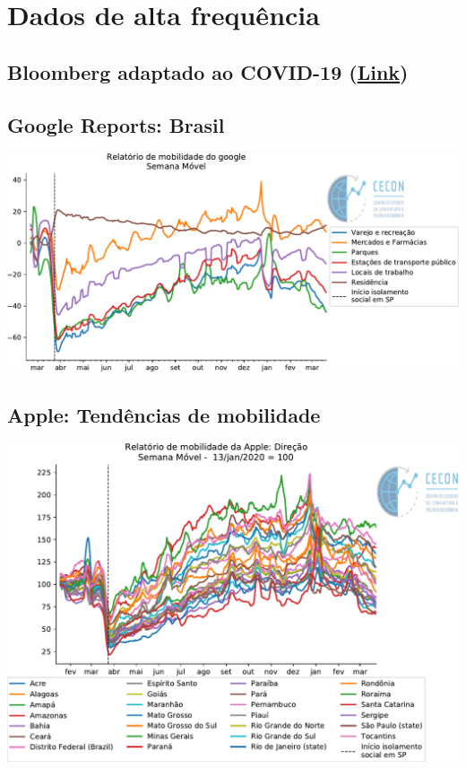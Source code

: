 \documentclass{SelfArx}
\begin{document}
\section*{Dados de alta frequência}
\label{sec:org3865738}

\subsection*{Bloomberg adaptado ao COVID-19 (\href{https://www.bloomberg.com/news/articles/2020-11-13/alternative-data-show-activity-crashes-as-virus-resurges-chart}{Link})}
\label{sec:orga1af766}

\subsection*{Google Reports: Brasil}
\label{sec:org69354b3}

\begin{center}
\includegraphics[width=.9\linewidth]{./figs/Granulares/GoogleReport_Brasil.pdf}
\end{center}

\subsection*{Apple: Tendências de mobilidade}
\label{sec:org83fd206}

\begin{center}
\includegraphics[width=.9\linewidth]{./figs/Granulares/AppleReport_Brasil.pdf}
\end{center}
\end{document}
